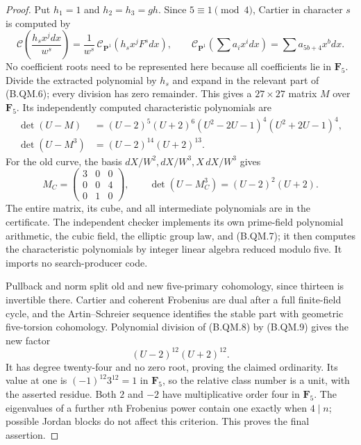 \documentclass[11pt,a4paper]{article}
\begin{document}
\begin{proof}
Put $h_1=1$ and $h_2=h_3=gh$. Since $5\equiv1\pmod4$,
Cartier in character $s$ is computed by
\[
 \mathcal C\!\left(\frac{h_s x^jdx}{w^s}\right)
   =\frac1{w^s}\,
      \mathcal C_{\mathbf P^1}(h_sx^jF^s dx),\qquad
 \mathcal C_{\mathbf P^1}\!\left(\sum a_i x^i dx\right)
        =\sum a_{5b+4}x^b dx.                                  \tag{B.QM.7}
\]
No coefficient roots need to be represented here because
all coefficients lie in $\mathbf F_5$. Divide the extracted
polynomial by $h_s$ and expand in the relevant part of
(B.QM.6); every division has zero remainder. This gives a
$27\times27$ matrix $M$ over $\mathbf F_5$. Its independently
computed characteristic polynomials are
\[
\begin{split}
 \det(U-M)
   &=(U-2)^5(U+2)^6
       (U^2-2U-1)^4(U^2+2U-1)^4,\\
 \det(U-M^3)&=(U-2)^{14}(U+2)^{13}.
\end{split}                                                    \tag{B.QM.8}
\]
For the old curve, the basis $dX/W^2,dX/W^3,X\,dX/W^3$ gives
\[
 M_C=\begin{pmatrix}3&0&0\\0&0&4\\0&1&0\end{pmatrix},\qquad
                \det(U-M_C^3)=(U-2)^2(U+2).                    \tag{B.QM.9}
\]
The entire matrix, its cube, and all intermediate polynomials
are in the certificate. The independent checker
 implements its own
prime-field polynomial arithmetic, the cubic field, the
elliptic group law, and (B.QM.7); it then computes the
characteristic polynomials by integer linear algebra reduced
modulo five. It imports no search-producer code.

Pullback and norm split old and new five-primary cohomology,
since thirteen is invertible there. Cartier and coherent
Frobenius are dual after a full finite-field cycle, and the
Artin--Schreier sequence identifies the stable part with
geometric five-torsion cohomology. Polynomial division of
(B.QM.8) by (B.QM.9) gives the new factor
\[
                  (U-2)^{12}(U+2)^{12}.                        \tag{B.QM.10}
\]
It has degree twenty-four and no zero root, proving the
claimed ordinarity. Its value at one is
$(-1)^{12}3^{12}=1$ in $\mathbf F_5$, so the relative
class number is a unit, with the asserted residue.
Both $2$ and $-2$ have multiplicative order four in
$\mathbf F_5$. The eigenvalues of a further $n$th Frobenius
power contain one exactly when $4\mid n$; possible Jordan
blocks do not affect this criterion. This proves the final
assertion.
\end{proof}
\end{document}
